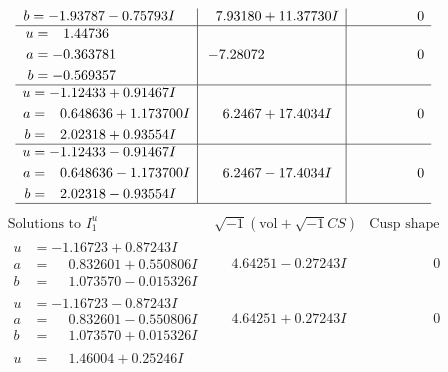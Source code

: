 \documentclass[1p]{elsarticle_modified}
\theoremstyle{definition}
\newcommand{\I}{\sqrt{-1}}
\begin{document}
$$\begin{array}{c|c|c}
\begin{aligned}
b &= -1.93787 - 0.75793 I\end{aligned}
 & \phantom{-}7.93180 + 11.37730 I & \phantom{-0.000000 } 0 \\ \hline\begin{aligned}
u &= \phantom{-}1.44736\phantom{ +0.000000I} \\
a &= -0.363781\phantom{ +0.000000I} \\
b &= -0.569357\phantom{ +0.000000I}\end{aligned}
 & -7.28072\phantom{ +0.000000I} & \phantom{-0.000000 } 0 \\ \hline\begin{aligned}
u &= -1.12433 + 0.91467 I \\
a &= \phantom{-}0.648636 + 1.173700 I \\
b &= \phantom{-}2.02318 + 0.93554 I\end{aligned}
 & \phantom{-}6.2467 + 17.4034 I & \phantom{-0.000000 } 0 \\ \hline\begin{aligned}
u &= -1.12433 - 0.91467 I \\
a &= \phantom{-}0.648636 - 1.173700 I \\
b &= \phantom{-}2.02318 - 0.93554 I\end{aligned}
 & \phantom{-}6.2467 - 17.4034 I & \phantom{-0.000000 } 0\\
 \hline 
 \end{array}$$\newpage$$\begin{array}{c|c|c}  
\text{Solutions to }I^u_{1}& \I (\text{vol} + \sqrt{-1}CS) & \text{Cusp shape}\\
 \hline 
\begin{aligned}
u &= -1.16723 + 0.87243 I \\
a &= \phantom{-}0.832601 + 0.550806 I \\
b &= \phantom{-}1.073570 - 0.015326 I\end{aligned}
 & \phantom{-}4.64251 - 0.27243 I & \phantom{-0.000000 } 0 \\ \hline\begin{aligned}
u &= -1.16723 - 0.87243 I \\
a &= \phantom{-}0.832601 - 0.550806 I \\
b &= \phantom{-}1.073570 + 0.015326 I\end{aligned}
 & \phantom{-}4.64251 + 0.27243 I & \phantom{-0.000000 } 0 \\ \hline\begin{aligned}
u &= \phantom{-}1.46004 + 0.25246 I \\

\end{aligned}
\end{array}$$
\end{document}
